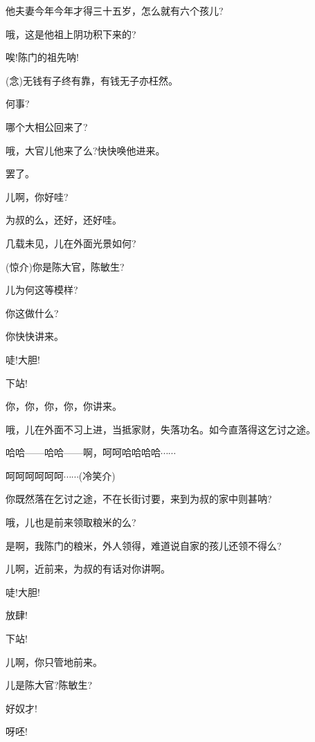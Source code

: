 {他夫妻今年今年才得三十五岁，怎么就有六个孩儿?

哦，这是他祖上阴功积下来的?

唉!陈门的祖先呐!


\vspace{5pt}

({\akai 念})无钱有子终有靠，有钱无子亦枉然。

何事?

哪个大相公回来了?

哦，大官儿他来了么?快快唤他进来。

罢了。

儿啊，你好哇?

为叔的么，还好，还好哇。

几载未见，儿在外面光景如何?

({\hwfs 惊介})你是陈大官，陈敏生?

儿为何这等模样?

你这做什么?

你快快讲来。

唗!大胆!

下站!

你，你，你，你，你讲来。

哦，儿在外面不习上进，当抵家财，失落功名。如今直落得这乞讨之途。

哈哈------哈哈------啊，呵呵哈哈哈哈$\cdots{}\cdots{}$

呵呵呵呵呵呵$\cdots{}\cdots{}$({\hwfs 冷笑介})

你既然落在乞讨之途，不在长街讨要，来到为叔的家中则甚呐?

哦，儿也是前来领取粮米的么?

是啊，我陈门的粮米，外人领得，难道说自家的孩儿还领不得么?

儿啊，近前来，为叔的有话对你讲啊。

唗!大胆!

放肆!

下站!

儿啊，你只管地前来。

儿是陈大官?陈敏生?

好奴才!

呀呸!


}
